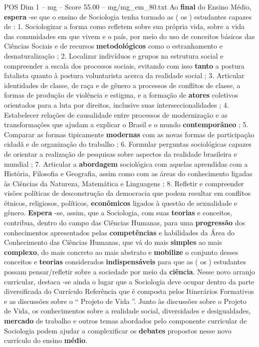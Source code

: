 \begin{textsample}{POS Dim 1 – mg – Score 55.00 – mg/mg\_em\_80.txt}
Ao \textbf{final} do Ensino Médio, \textbf{espera} -se que o ensino de Sociologia tenha tornado as ( os ) estudantes capazes de : 1.
Sociologizar a forma como refletem sobre sua própria vida, sobre a vida das comunidades em que vivem e o país, por meio do uso de conceitos básicos das Ciências Sociais e de recursos \textbf{metodológicos} como o estranhamento e desnaturalização ; 2.
Localizar indivíduos e grupos na estrutura social e compreender a escala dos processos sociais, evitando com isso \textbf{tanto} a postura fatalista quanto à postura voluntarista acerca da realidade social ; 3.
Articular identidades de classe, de raça e de gênero a processos de conflitos de classe, a formas de produção de violência e estigma, e a formação de \textbf{atores} coletivos orientados para a luta por direitos, inclusive suas interseccionalidades ; 4.
Estabelecer relações de causalidade entre processos de modernização e as transformações que ajudam a explicar o Brasil e o mundo \textbf{contemporâneo} ; 5.
Comparar as formas tipicamente \textbf{modernas} com as novas formas de participação cidadã e de organização do trabalho ; 6.
Formular perguntas sociológicas capazes de orientar a realização de pesquisas sobre aspectos da realidade brasileira e mundial ; 7.
Articular a \textbf{abordagem} sociológica com aquelas aprendidas com a História, Filosofia e Geografia, assim como com as áreas do conhecimento ligadas às Ciências da Natureza, Matemática e Linguagens ; 8.
Refletir e compreender visões políticas de desconstrução da democracia que podem resultar em conflitos étnicos, religiosos, políticos, \textbf{econômicos} ligados à questão de sexualidade e gênero. \textbf{Espera} -se, assim, que a Sociologia, com suas \textbf{teorias} e conceitos, contribua, dentro do campo das Ciências Humanas, para uma \textbf{progressão} dos conhecimentos apresentados pelas \textbf{competências} e habilidades da Área do Conhecimento das Ciências Humanas, que vá do mais \textbf{simples} ao mais \textbf{complexo}, do mais concreto ao mais abstrato e \textbf{mobilize} o conjunto desses conceitos e \textbf{teorias} considerados \textbf{indispensáveis} para que as ( os ) estudantes possam pensar/refletir sobre a sociedade por meio da \textbf{ciência}.
Nesse novo arranjo curricular, destaca -se ainda o lugar que a Sociologia deve ocupar dentro da parte diversificada do Currículo Referência que é composta pelos Itinerários Formativos e as discussões sobre o “ Projeto de Vida ”.
Junto às discussões sobre o Projeto de Vida, os conhecimentos sobre a realidade social, diversidades e desigualdades, \textbf{mercado} de trabalho e outros temas abordados pelo componente curricular de Sociologia podem ajudar a complexificar os \textbf{debates} propostos nesse novo currículo do ensino \textbf{médio}.

\end{textsample}
